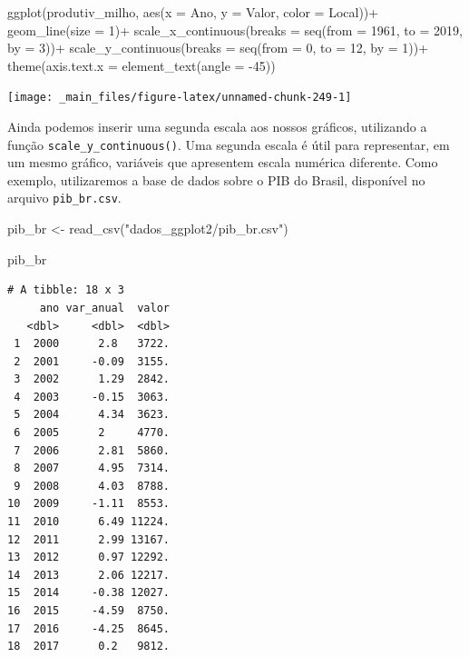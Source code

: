 \documentclass[
  brazilian,
]{book}
\newenvironment{Shaded}{\begin{snugshade}}{\end{snugshade}}
\newcommand{\AttributeTok}[1]{\textcolor[rgb]{0.77,0.63,0.00}{#1}}
\newcommand{\DecValTok}[1]{\textcolor[rgb]{0.00,0.00,0.81}{#1}}
\newcommand{\FunctionTok}[1]{\textcolor[rgb]{0.00,0.00,0.00}{#1}}
\newcommand{\NormalTok}[1]{#1}
\newcommand{\OtherTok}[1]{\textcolor[rgb]{0.56,0.35,0.01}{#1}}
\newcommand{\SpecialCharTok}[1]{\textcolor[rgb]{0.00,0.00,0.00}{#1}}
\newcommand{\StringTok}[1]{\textcolor[rgb]{0.31,0.60,0.02}{#1}}
\begin{document}
\begin{Shaded}
\begin{Highlighting}[]
\FunctionTok{ggplot}\NormalTok{(produtiv\_milho, }
       \FunctionTok{aes}\NormalTok{(}\AttributeTok{x =}\NormalTok{ Ano,}
           \AttributeTok{y =}\NormalTok{ Valor,}
           \AttributeTok{color =}\NormalTok{ Local))}\SpecialCharTok{+}
  \FunctionTok{geom\_line}\NormalTok{(}\AttributeTok{size =} \DecValTok{1}\NormalTok{)}\SpecialCharTok{+}
  \FunctionTok{scale\_x\_continuous}\NormalTok{(}\AttributeTok{breaks =} \FunctionTok{seq}\NormalTok{(}\AttributeTok{from =} \DecValTok{1961}\NormalTok{, }\AttributeTok{to =} \DecValTok{2019}\NormalTok{, }\AttributeTok{by =} \DecValTok{3}\NormalTok{))}\SpecialCharTok{+}
  \FunctionTok{scale\_y\_continuous}\NormalTok{(}\AttributeTok{breaks =} \FunctionTok{seq}\NormalTok{(}\AttributeTok{from =} \DecValTok{0}\NormalTok{, }\AttributeTok{to =} \DecValTok{12}\NormalTok{, }\AttributeTok{by =} \DecValTok{1}\NormalTok{))}\SpecialCharTok{+}
  \FunctionTok{theme}\NormalTok{(}\AttributeTok{axis.text.x =} \FunctionTok{element\_text}\NormalTok{(}\AttributeTok{angle =} \SpecialCharTok{{-}}\DecValTok{45}\NormalTok{))}
\end{Highlighting}
\end{Shaded}

\begin{center}\texttt{[image: \_main\_files/figure-latex/unnamed-chunk-249-1]} \end{center}

Ainda podemos inserir uma segunda escala aos nossos gráficos, utilizando a função \texttt{scale\_y\_continuous()}. Uma segunda escala é útil para representar, em um mesmo gráfico, variáveis que apresentem escala numérica diferente. Como exemplo, utilizaremos a base de dados sobre o PIB do Brasil, disponível no arquivo \texttt{pib\_br.csv}.

\begin{Shaded}
\begin{Highlighting}[]
\NormalTok{pib\_br }\OtherTok{\textless{}{-}} \FunctionTok{read\_csv}\NormalTok{(}\StringTok{"dados\_ggplot2/pib\_br.csv"}\NormalTok{)}

\NormalTok{pib\_br}
\end{Highlighting}
\end{Shaded}

\begin{verbatim}
# A tibble: 18 x 3
     ano var_anual  valor
   <dbl>     <dbl>  <dbl>
 1  2000      2.8   3722.
 2  2001     -0.09  3155.
 3  2002      1.29  2842.
 4  2003     -0.15  3063.
 5  2004      4.34  3623.
 6  2005      2     4770.
 7  2006      2.81  5860.
 8  2007      4.95  7314.
 9  2008      4.03  8788.
10  2009     -1.11  8553.
11  2010      6.49 11224.
12  2011      2.99 13167.
13  2012      0.97 12292.
14  2013      2.06 12217.
15  2014     -0.38 12027.
16  2015     -4.59  8750.
17  2016     -4.25  8645.
18  2017      0.2   9812.
\end{verbatim}
\end{document}
